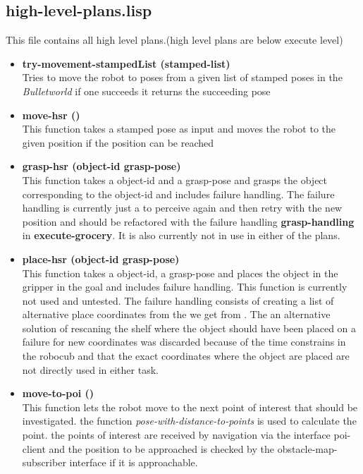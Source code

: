 \documentclass[main.tex]{subfiles}
\begin{document}
	    \subsection{high-level-plans.lisp}
	    \label{high-level}
	    This file contains all high level plans.(high level plans are below execute level)
	    \begin{itemize}
		\item \textbf{try-movement-stampedList (stamped-list)} \\
		Tries to move the robot to poses from a given list of stamped poses in the \textit{Bulletworld} if one succeeds it returns the succeeding pose 
	    \item \textbf{move-hsr ()} \\
	    This function takes a stamped pose as input and moves the robot to the given position if the position can be reached
	    \item \textbf{grasp-hsr (object-id grasp-pose)} \\
	    This function takes a object-id and a grasp-pose and grasps the object corresponding to the object-id and includes failure handling. The failure handling is currently just a to perceive again and then retry with the new position and should be refactored with the failure handling \textbf{grasp-handling} in \textbf{execute-grocery}.
	    It is also currently not in use in either of the plans.
	    \item \textbf{place-hsr (object-id grasp-pose)} \\
	    This function takes a object-id, a grasp-pose and places the object in the gripper in the goal and includes failure handling. This function is currently not used and untested. The failure handling consists of creating a list of alternative place coordinates from the we get from . The an alternative solution of rescaning the shelf where the object should have been placed on a failure for new coordinates was discarded because of the time constrains in the robocub and that the exact coordinates where the object are placed are not directly used in either task. 
	    \item \textbf{move-to-poi ()} \\
	    This function lets the robot move to the next point of interest that should be investigated. the function \textit{pose-with-distance-to-points} is used to calculate the point. the points of interest are received by navigation via the interface poi-client and the position to be approached is checked by the obstacle-map-subscriber interface if it is approachable.

\end{itemize}
\end{document}
